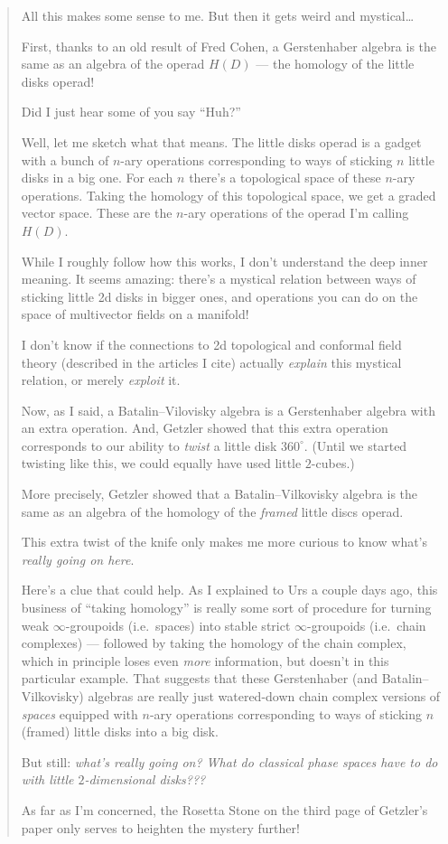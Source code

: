 \documentclass{article}
\begin{document}
\begin{quote}
All this makes some sense to me. But then it gets weird and
mystical\ldots{}

First, thanks to an old result of Fred Cohen, a Gerstenhaber algebra is
the same as an algebra of the operad \(H(D)\) --- the homology of the
little disks operad!

Did I just hear some of you say ``Huh?''

Well, let me sketch what that means. The little disks operad is a gadget
with a bunch of \(n\)-ary operations corresponding to ways of sticking
\(n\) little disks in a big one. For each \(n\) there's a topological
space of these \(n\)-ary operations. Taking the homology of this
topological space, we get a graded vector space. These are the \(n\)-ary
operations of the operad I'm calling \(H(D)\).

While I roughly follow how this works, I don't understand the deep inner
meaning. It seems amazing: there's a mystical relation between ways of
sticking little 2d disks in bigger ones, and operations you can do on
the space of multivector fields on a manifold!

I don't know if the connections to 2d topological and conformal field
theory (described in the articles I cite) actually \emph{explain} this
mystical relation, or merely \emph{exploit} it.

Now, as I said, a Batalin--Vilovisky algebra is a Gerstenhaber algebra
with an extra operation. And, Getzler showed that this extra operation
corresponds to our ability to \emph{twist} a little disk \(360^\circ\).
(Until we started twisting like this, we could equally have used little
\(2\)-cubes.)

More precisely, Getzler showed that a Batalin--Vilkovisky algebra is the
same as an algebra of the homology of the \emph{framed} little discs
operad.

This extra twist of the knife only makes me more curious to know what's
\emph{really going on here}.

Here's a clue that could help. As I explained to Urs a couple days ago,
this business of ``taking homology'' is really some sort of procedure
for turning weak \(\infty\)-groupoids (i.e.~spaces) into stable strict
\(\infty\)-groupoids (i.e.~chain complexes) --- followed by taking the
homology of the chain complex, which in principle loses even \emph{more}
information, but doesn't in this particular example. That suggests that
these Gerstenhaber (and Batalin--Vilkovisky) algebras are really just
watered-down chain complex versions of \emph{spaces} equipped with
\(n\)-ary operations corresponding to ways of sticking \(n\) (framed)
little disks into a big disk.

But still: \emph{what's really going on? What do classical phase spaces
have to do with little \(2\)-dimensional disks???}

As far as I'm concerned, the Rosetta Stone on the third page of
Getzler's paper only serves to heighten the mystery further!
\end{quote}
\end{document}
